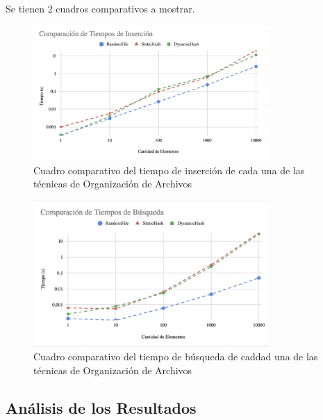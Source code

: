 \documentclass{article}
\begin{document}
      Se tienen 2 cuadros comparativos a mostrar.
    
      \begin{figure}[h]

        \includegraphics[width = 0.8\textwidth]{tiempoInsercion}
        \caption{Cuadro comparativo del tiempo de inserción de cada una de las técnicas de Organización de Archivos}

      \end{figure}

      \begin{figure}[h]

        \includegraphics[width = 0.8\textwidth]{tiempoBusqueda}
        \caption{Cuadro comparativo del tiempo de búsqueda de caddad una de las técnicas de Organización de Archivos}

      \end{figure}

    \subsection{Análisis de los Resultados}
\end{document}
